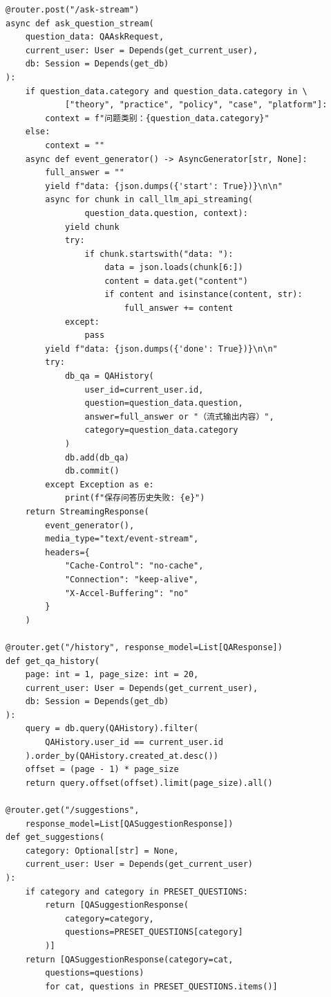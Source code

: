 \documentclass[a4paper,10pt]{article}
\begin{document}
\begin{lstlisting}
@router.post("/ask-stream")
async def ask_question_stream(
    question_data: QAAskRequest,
    current_user: User = Depends(get_current_user),
    db: Session = Depends(get_db)
):
    if question_data.category and question_data.category in \
            ["theory", "practice", "policy", "case", "platform"]:
        context = f"问题类别：{question_data.category}"
    else:
        context = ""
    async def event_generator() -> AsyncGenerator[str, None]:
        full_answer = ""
        yield f"data: {json.dumps({'start': True})}\n\n"
        async for chunk in call_llm_api_streaming(
                question_data.question, context):
            yield chunk
            try:
                if chunk.startswith("data: "):
                    data = json.loads(chunk[6:])
                    content = data.get("content")
                    if content and isinstance(content, str):
                        full_answer += content
            except:
                pass
        yield f"data: {json.dumps({'done': True})}\n\n"
        try:
            db_qa = QAHistory(
                user_id=current_user.id,
                question=question_data.question,
                answer=full_answer or "（流式输出内容）",
                category=question_data.category
            )
            db.add(db_qa)
            db.commit()
        except Exception as e:
            print(f"保存问答历史失败: {e}")
    return StreamingResponse(
        event_generator(),
        media_type="text/event-stream",
        headers={
            "Cache-Control": "no-cache",
            "Connection": "keep-alive",
            "X-Accel-Buffering": "no"
        }
    )

@router.get("/history", response_model=List[QAResponse])
def get_qa_history(
    page: int = 1, page_size: int = 20,
    current_user: User = Depends(get_current_user),
    db: Session = Depends(get_db)
):
    query = db.query(QAHistory).filter(
        QAHistory.user_id == current_user.id
    ).order_by(QAHistory.created_at.desc())
    offset = (page - 1) * page_size
    return query.offset(offset).limit(page_size).all()

@router.get("/suggestions",
    response_model=List[QASuggestionResponse])
def get_suggestions(
    category: Optional[str] = None,
    current_user: User = Depends(get_current_user)
):
    if category and category in PRESET_QUESTIONS:
        return [QASuggestionResponse(
            category=category,
            questions=PRESET_QUESTIONS[category]
        )]
    return [QASuggestionResponse(category=cat,
        questions=questions)
        for cat, questions in PRESET_QUESTIONS.items()]
\end{lstlisting}
\end{document}
